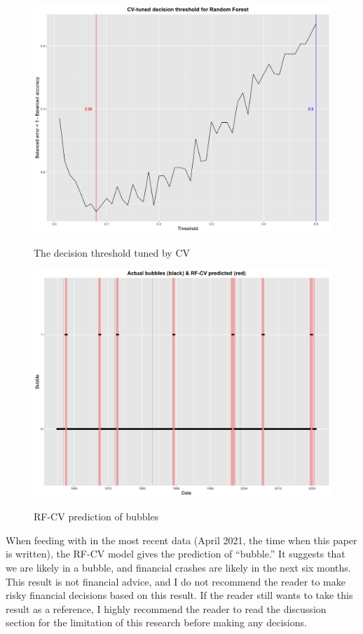 \documentclass[12pt, man, a4paper, floatsintext]{apa7}
\begin{document}
\begin{figure}
    \centering
    \caption{The decision threshold tuned by CV}
    \includegraphics[width=15cm]{cv_threshold.png}
    \label{fig:cv_threshold}
\end{figure}

\begin{figure}
    \centering
    \caption{RF-CV prediction of bubbles}
    \includegraphics[width=15cm]{rfcv_full.png}
    \label{fig:rfcv_full}
\end{figure}

When feeding with in the most recent data (April 2021, the time when this paper is written), the RF-CV model gives the prediction of “bubble.” It suggests that we are likely in a bubble, and financial crashes are likely in the next six months. This result is not financial advice, and I do not recommend the reader to make risky financial decisions based on this result. If the reader still wants to take this result as a reference, I highly recommend the reader to read the discussion section for the limitation of this research before making any decisions.
\end{document}
